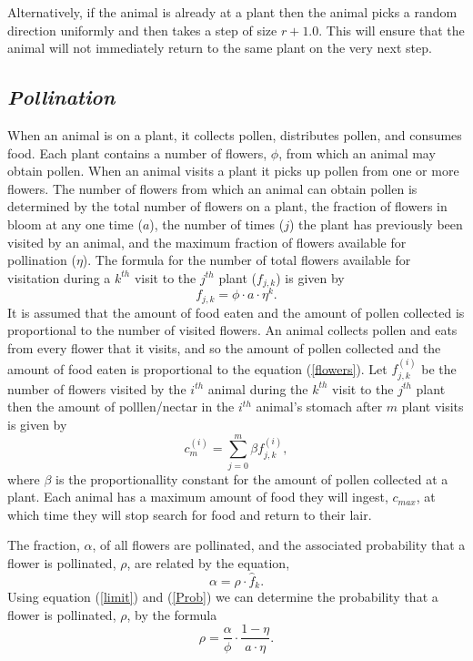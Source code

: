 \documentclass{tran-l}
\theoremstyle{definition}
\theoremstyle{remark}
\numberwithin{equation}{subsection}
\begin{document}
Alternatively, if the animal is already at a plant then the animal picks a random direction uniformly and then takes a step of size $r+1.0$.  This will ensure that the animal will not immediately return to the same plant on the very next step.

\subsection{\emph{Pollination}}
When an animal is on a plant, it collects pollen, distributes pollen, and
consumes food. Each plant contains a number of flowers, $\phi$, from which an
animal may obtain pollen. When an animal visits a plant it picks up pollen from
one or more flowers. The number of flowers from which an animal can obtain
pollen is determined by the total number of flowers on a plant, the fraction of
flowers in bloom at any one time ($a$), the number of times ($j$) the plant has
previously been visited by an animal, and the maximum fraction of flowers
available for pollination ($\eta$). The formula for the number of total flowers
available for visitation during a $k^{th}$ visit to the $j^{th}$ plant
($f_{j,k}$) is given by
\begin{equation}\label{flowers}
	f_{j,k} = \phi \cdot a \cdot \eta^k.
\end{equation}
It is assumed that the amount of food eaten and the amount of pollen collected
is proportional to the number of visited flowers. An animal collects pollen and
eats from every flower that it visits, and so the amount of pollen collected and
the amount of food eaten is proportional to the equation (\ref{flowers}). Let
$f^{\left(i\right)}_{j,k}$ be the number of flowers visited by the $i^{th}$
animal during the $k^{th}$ visit to the $j^{th}$ plant then the amount of
polllen/nectar in the $i^{th}$ animal's stomach after $m$ plant visits is given
by
\[
	c^{\left(i\right)}_m = \sum_{j=0}^{m} \beta f^{\left(i\right)}_{j,k},
\]
where $\beta$ is the proportionallity constant for the amount of pollen
collected at a plant.  Each animal has a maximum amount of food they will ingest, $c_{max}$, at which time they will stop search for food and return to their lair. %

The fraction, $\alpha$, of all flowers are pollinated, and the associated probability that a flower is pollinated, $\rho$, are related by the equation,
\begin{equation} \label{Prob}
	\alpha = \rho \cdot \hat{f}_k.
\end{equation}
Using equation (\ref{limit}) and (\ref{Prob}) we can determine the probability
that a flower is pollinated, $\rho$, by the formula
\[
	\rho = \frac{\alpha}{\phi} \cdot \frac{1 - \eta}{a \cdot \eta}.
\]
\end{document}
